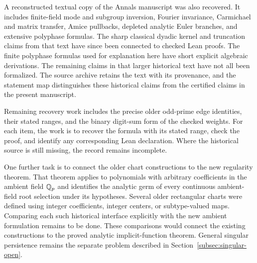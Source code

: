 A reconstructed textual copy of the Annals manuscript was also recovered.
It includes finite-field mode and subgroup inversion, Fourier invariance,
Carmichael and matrix transfer, Amice pullbacks, depleted analytic Euler
branches, and extensive polyphase formulas. The sharp classical dyadic kernel
and truncation claims from that text have since been connected to checked
Lean proofs. The finite polyphase formulas used for explanation here have
short explicit algebraic derivations. The remaining claims in that larger
historical text have not all been formalized.
The source archive retains the text with its provenance, and the statement
map distinguishes these historical claims from the certified claims in the
present manuscript.

Remaining recovery work includes the precise older odd-prime edge identities,
their stated ranges, and the binary digit-sum form of the checked weights.
For each item, the work is to recover the formula with its stated range,
check the proof, and identify any corresponding Lean declaration. Where the
historical source is still missing, the record remains incomplete.

One further task is to connect the older chart constructions to the new
regularity theorem. That theorem applies to polynomials with arbitrary
coefficients in the ambient field $\mathbb Q_p$ and identifies the analytic
germ of every continuous ambient-field root selection under its hypotheses.
Several older rectangular charts were defined using integer coefficients,
integer centers, or subtype-valued maps. Comparing each such historical
interface explicitly with the new ambient formulation remains to be done.
These comparisons would connect the existing constructions to the proved
analytic implicit-function theorem. General singular persistence remains the
separate problem described in Section~\ref{subsec:singular-open}.
